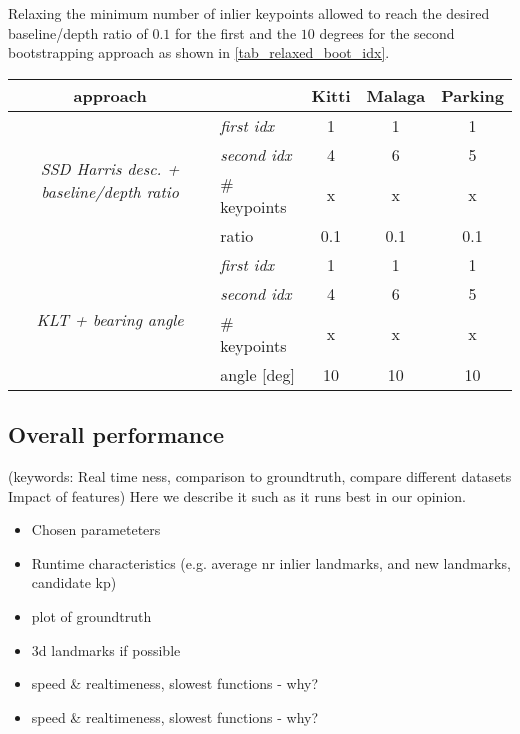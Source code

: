 Relaxing the minimum number of inlier keypoints allowed to reach the desired baseline/depth ratio of $0.1$ for the first and the $10$ degrees for the second bootstrapping approach as shown in \cref{tab_relaxed_boot_idx}.
\begin{center}
	\begin{tabular}{ c | l | c  c  c }
		approach &				 &				Kitti &		Malaga &	Parking\\
  		\hline
 \multirow{4}{*}{\textit{SSD Harris desc. + baseline/depth ratio}} &	\textit{first idx} &	1 & 		1 & 		1\\
  		 & 						\textit{second idx} &	4 & 		6 & 		5\\
  		& 						\# keypoints & 		x & 		x & 		x\\
  		&						ratio	 & 			0.1 &		0.1 &		0.1\\
  		\hline
  \multirow{4}{*}{\textit{KLT + bearing angle}} &	\textit{first idx} &	1 & 		1 & 		1\\
  		 & 						\textit{second idx} &	4 & 		6 & 		5\\
  		& 						\# keypoints & 		x & 		x & 		x\\
  		&						angle [deg] & 		10 &		10 &		10\\
  		\hline
	\end{tabular}
	\label{tab_relaxed_boot_idx}
\end{center}



\subsection{Overall performance}
(keywords: Real time ness, comparison to groundtruth, compare different datasets
Impact of features) Here we describe it such as it runs best in our opinion.

\begin{itemize}
	\item Chosen parameteters
	\item Runtime characteristics (e.g. average nr inlier landmarks, and new landmarks, candidate kp)
	\item plot of groundtruth
	\item 3d landmarks if possible
	\item speed \& realtimeness, slowest functions - why?
	\item speed \& realtimeness, slowest functions - why?
\end{itemize}

